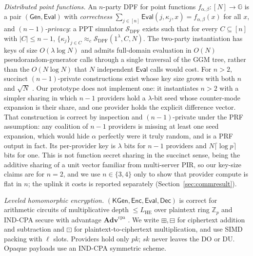 \documentclass[a4paper,fleqn]{cas-sc}
\newcommand{\PPT}{\mathrm{PPT}}
\newcommand{\Sim}{\mathcal{S}}
\newcommand{\cind}{\approx_c}
\newcommand{\Gen}{\mathsf{Gen}}
\newcommand{\Eval}{\mathsf{Eval}}
\newcommand{\Dec}{\mathsf{Dec}}
\newcommand{\Enc}{\mathsf{Enc}}
\newcommand{\advCPA}{\mathbf{Adv}^{\mathrm{cpa}}}
\newcommand{\bplus}{\boxplus}
\newcommand{\bminus}{\boxminus}
\newcommand{\bdot}{\boxdot}
\begin{document}
\emph{Distributed point functions.} An $n$-party DPF
\citep{gilboa2014distributed,boyle2015function,boyle2016function} for point
functions $f_{\alpha,\beta}:[N]\!\to\!\mathbb{G}$ is a pair $(\Gen,\Eval)$
with \emph{correctness} $\sum_{j\in[n]}\Eval(j,\kappa_j,x)=
f_{\alpha,\beta}(x)$ for all $x$, and \emph{$(n{-}1)$-privacy}: a $\PPT$
simulator $\Sim_{\mathrm{DPF}}$ exists such that for every $C\subseteq[n]$
with $|C|\le n{-}1$, $\{\kappa_j\}_{j\in C}\cind
\Sim_{\mathrm{DPF}}(1^\lambda,C,N)$. The two-party instantiation has keys of
size $O(\lambda\log N)$ and admits full-domain evaluation in $O(N)$
pseudorandom-generator calls through a single traversal of the GGM tree,
rather than the $O(N\log N)$ that $N$ independent $\Eval$ calls would cost.
For $n>2$, succinct $(n{-}1)$-private constructions exist whose key size grows
with both $n$ and $\sqrt{N}$ \citep{boyle2015function}. Our prototype does not
implement one: it instantiates $n>2$ with a simpler sharing in which $n-1$
providers hold a $\lambda$-bit seed whose counter-mode expansion is their
share, and one provider holds the explicit difference vector. That
construction is correct by inspection and $(n{-}1)$-private under the PRF
assumption: any coalition of $n-1$ providers is missing at least one seed
expansion, which would hide $\alpha$ perfectly were it truly random, and is a
PRF output in fact. Its per-provider key is $\lambda$ bits for $n-1$ providers
and $N\lceil\log p\rceil$ bits for one. This is not function secret sharing in
the succinct sense, being the additive sharing of a unit vector familiar from
multi-server PIR, so our key-size claims are for $n=2$, and we use
$n\in\{3,4\}$ only to show that provider compute is flat in $n$; the uplink it
costs is reported separately (Section~\ref{sec:commresult}).

\emph{Leveled homomorphic encryption.} $(\mathsf{KGen},\allowbreak\Enc,\allowbreak\Eval,\allowbreak\Dec)$ is
correct for arithmetic circuits of multiplicative depth $\le L_{\mathrm{HE}}$
over plaintext ring $\mathbb{Z}_p$ and IND-CPA secure with advantage
$\advCPA$ \citep{fan2012somewhat,cryptoeprint:2016/421}. We write
$\bplus,\bminus$ for ciphertext addition and subtraction and $\bdot$ for
plaintext-to-ciphertext multiplication, and use SIMD packing with $\ell$
slots. Providers hold only $pk$; $sk$ never leaves the DO or DU. Opaque
payloads use an IND-CPA symmetric scheme.

\end{document}
